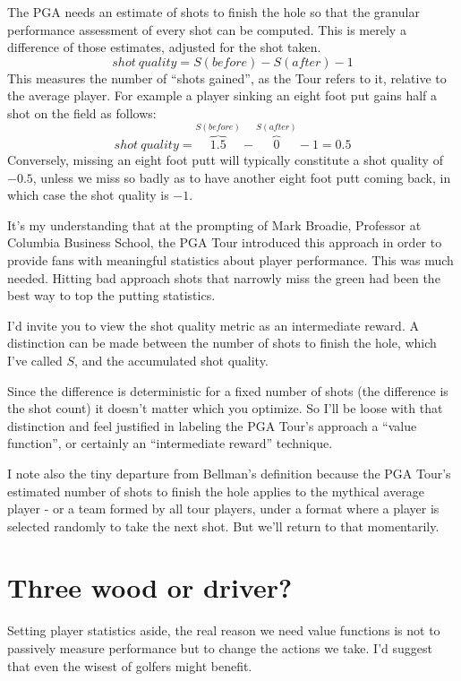 The PGA needs an estimate of shots to finish the hole so that the granular performance assessment of every shot can be computed. This is merely a difference of those estimates, adjusted for the shot taken.
$$
      shot\ quality =  S(before)-S(after)-1
$$
This measures the number of ``shots gained'', as the Tour refers to it, relative to the average player. For example a player sinking an eight foot put gains half a shot on the field as follows:
$$
      shot\ quality =  \overbrace{1.5}^{S(before)}-\overbrace{0}^{S(after)}-1 = 0.5
$$
Conversely, missing an eight foot putt will typically constitute a shot quality of $-0.5$, unless we miss so badly as to have another eight foot putt coming back, in which case the shot quality is $-1$. 

It's my understanding that at the prompting of Mark Broadie, Professor at Columbia Business School, the PGA Tour introduced this approach in order to provide fans with meaningful statistics about player performance. This was much needed. Hitting bad approach shots that narrowly miss the green had been the best way to top the putting statistics. 

I'd invite you to view the shot quality metric as an intermediate reward. A distinction can be made between the number of shots to finish the hole, which I've called $S$, and the accumulated shot quality. 


Since the difference is deterministic for a fixed number of shots (the difference is the shot count) it doesn't matter which you optimize. So I'll be loose with that distinction and feel justified in labeling the PGA Tour's approach a ``value function'', or certainly an ``intermediate reward'' technique. 

I note also the tiny departure from Bellman's definition because the PGA Tour's estimated number of shots to finish the hole applies to the mythical average player - or a team formed by all tour players, under a format where a player is selected randomly to take the next shot. But we'll return to that momentarily. 

\section{Three wood or driver?}

Setting player statistics aside, the real reason we need value functions is not to passively measure performance but to change the actions we take. I'd suggest that even the wisest of golfers might benefit. 
 
